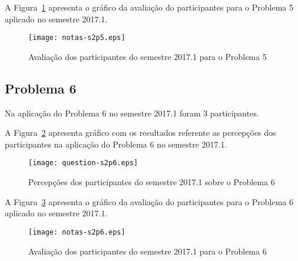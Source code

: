 A Figura~\ref{aval-s2p5} apresenta o gráfico da
avaliação do participantes para o Problema 5 aplicado no semestre 2017.1.

\begin{figure}[!htb]
\centering
\texttt{[image: notas-s2p5.eps]}
\caption{Avaliação dos participantes do semestre 2017.1 para o Problema 5}
\label{aval-s2p5}
\end{figure}

\subsection{Problema 6}
Na aplicação do Problema 6 no semestre 2017.1 foram 3 participantes.

A Figura~\ref{percep-s2p6} apresenta gráfico com os resultados referente
as percepções dos participantes na aplicação do
Problema 6 no semestre 2017.1.

\begin{figure}[!htb]
\centering
\texttt{[image: question-s2p6.eps]}
\caption{Percepções dos participantes do semestre 2017.1 sobre o Problema 6}
\label{percep-s2p6}
\end{figure}

A Figura~\ref{aval-s2p6} apresenta o gráfico da
avaliação do participantes para o Problema 6 aplicado no semestre 2017.1.

\begin{figure}[!htb]
\centering
\texttt{[image: notas-s2p6.eps]}
\caption{Avaliação dos participantes do semestre 2017.1 para o Problema 6}
\label{aval-s2p6}
\end{figure}
